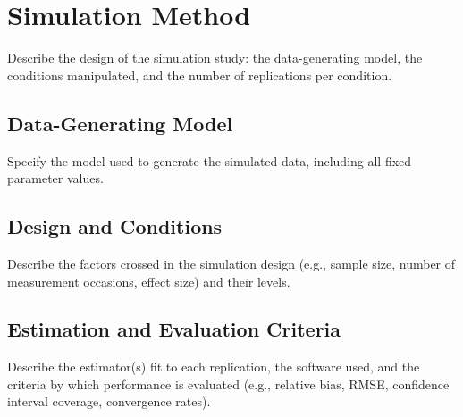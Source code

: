 \section{Simulation Method}

Describe the design of the simulation study: the data-generating
model, the conditions manipulated, and the number of replications per
condition.

\subsection{Data-Generating Model}

Specify the model used to generate the simulated data, including all
fixed parameter values.

\subsection{Design and Conditions}

Describe the factors crossed in the simulation design (e.g., sample
size, number of measurement occasions, effect size) and their levels.

\subsection{Estimation and Evaluation Criteria}

Describe the estimator(s) fit to each replication, the software used,
and the criteria by which performance is evaluated (e.g., relative
bias, RMSE, confidence interval coverage, convergence rates).
